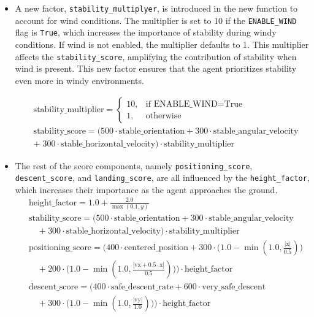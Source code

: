 \documentclass[a4paper, 12pt, fleqn]{report}
\begin{document}
\begin{itemize}
    \item A new factor, \texttt{stability\_multiplyer}, is introduced in the new function to account for wind conditions. The multiplier is set to 10 if the \texttt{ENABLE\_WIND} flag is \texttt{True}, which increases the importance of stability during windy conditions. If wind is not enabled, the multiplier defaults to 1. This multiplier affects the \texttt{stability\_score}, amplifying the contribution of stability when wind is present. This new factor ensures that the agent prioritizes stability even more in windy environments. 
    {\scriptsize
    \begin{center}
    \begin{align*}
        & \text{stability\_multiplier} =
        \begin{cases}
            10, & \text{if } \text{ENABLE\_WIND} = \text{True} \\
            1, & \text{otherwise}
        \end{cases} \\[0.5em]
        & \text{stability\_score} = \big(
            500 \cdot \text{stable\_orientation} +
            300 \cdot \text{stable\_angular\_velocity} \\
            & + \; 300 \cdot \text{stable\_horizontal\_velocity}
        \big) \cdot \text{stability\_multiplier}
    \end{align*}
    \end{center}
    }
    
    
    \item The rest of the score components, namely \texttt{positioning\_score}, \texttt{descent\_score}, and \texttt{landing\_score}, are all influenced by the \texttt{height\_factor}, which increases their importance as the agent approaches the ground.
{\scriptsize
\begin{align*}
    & \text{height\_factor} = 1.0 + \frac{2.0}{\max(0.1, y)} \\[0.5em]
    & \text{stability\_score} = \big(
        500 \cdot \text{stable\_orientation} +
        300 \cdot \text{stable\_angular\_velocity} \\
    & \quad + 300 \cdot \text{stable\_horizontal\_velocity}
    \big) \cdot \text{stability\_multiplier} \\[0.5em]
    & \text{positioning\_score} = \big(
        400 \cdot \text{centered\_position} +
        300 \cdot \big(1.0 - \min(1.0, \tfrac{|\text{x}|}{0.5})\big) \\
    & \quad + 200 \cdot \big(1.0 - \min(1.0, \tfrac{|\text{vx} + 0.5 \cdot \text{x}|}{0.5})\big)
    \big) \cdot \text{height\_factor} \\[0.5em]
    & \text{descent\_score} = \big(
        400 \cdot \text{safe\_descent\_rate} +
        600 \cdot \text{very\_safe\_descent} \\
    & \quad + 300 \cdot \big(1.0 - \min(1.0, \tfrac{|\text{vy}|}{1.0})\big)
    \big) \cdot \text{height\_factor}
\end{align*}
}



\end{itemize}
\end{document}
